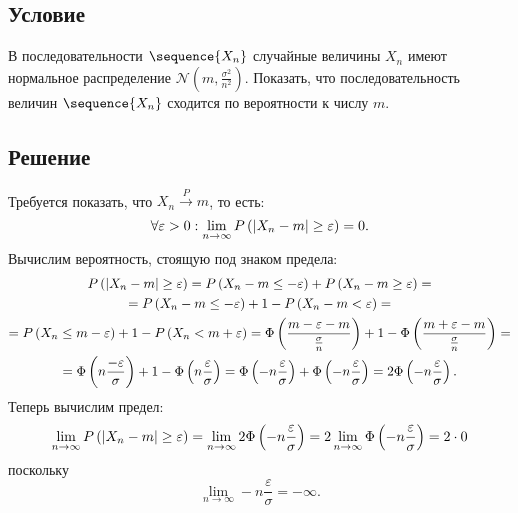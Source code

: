 \documentclass[a4paper,12pt]{article}
\begin{document}
    \subsection*{Условие}
    В последовательности $\sequence{X_n}$ случайные величины $X_n$ имеют нормальное распределение $\mathcal{N} \left ( m, \frac{\sigma^2}{n^2} \right )$.
    Показать, что последовательность величин $\sequence{X_n}$ сходится по вероятности к числу $m$.

    \subsection*{Решение}
    Требуется показать, что $X_n \stackrel{P}{\longrightarrow} m$, то есть:
    \begin{equation}
        \forall \varepsilon > 0: \lim_{n \rightarrow \infty} P \left (  \left |  X_n - m  \right | \ge \varepsilon  \right ) = 0 .
    \end{equation}
    Вычислим вероятность, стоящую под знаком предела:
    \begin{multline}
        P \left ( \left |  X_n - m  \right | \ge \varepsilon \right )
        = P \left ( X_n - m \le - \varepsilon \right ) + P \left ( X_n - m \ge \varepsilon \right ) = \\
        = P \left ( X_n - m \le - \varepsilon \right ) + 1 - P \left ( X_n - m < \varepsilon \right ) = \\
        = P \left ( X_n \le m - \varepsilon \right ) + 1 - P \left ( X_n < m + \varepsilon \right )
        = \Phi \left ( \frac{ m - \varepsilon - m}{\frac{\sigma}{n}} \right ) + 1 - \Phi \left ( \frac{m + \varepsilon - m}{\frac{\sigma}{n}} \right ) = \\
        = \Phi \left ( n \frac{-\varepsilon}{\sigma} \right ) + 1 - \Phi \left ( n \frac{\varepsilon}{\sigma} \right )
        = \Phi \left ( - n \frac{\varepsilon}{\sigma} \right ) + \Phi \left ( - n \frac{\varepsilon}{\sigma} \right )
        = 2 \Phi \left ( - n \frac{\varepsilon}{\sigma} \right ).
    \end{multline}
    Теперь вычислим предел:
    \begin{equation}
        \lim_{n \rightarrow \infty} P \left ( \left |  X_n - m  \right | \ge \varepsilon \right )
        = \lim_{n \rightarrow \infty} 2 \Phi \left ( - n \frac{\varepsilon}{\sigma} \right )
        = 2 \lim_{n \rightarrow \infty} \Phi \left ( - n \frac{\varepsilon}{\sigma} \right )
        = 2 \cdot 0
    \end{equation}
    поскольку
    \begin{equation}
        \lim_{n \rightarrow \infty} - n \frac{\varepsilon}{\sigma} = - \infty .
    \end{equation}
\end{document}
